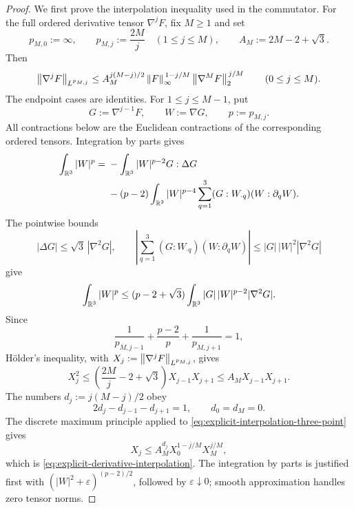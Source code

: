 \begin{proof}
We first prove the interpolation inequality used in the commutator.  For the
full ordered derivative tensor \(\nabla^jF\), fix \(M\ge1\) and set
\[
 p_{M,0}:=\infty,
 \qquad
 p_{M,j}:=\frac{2M}{j}\quad(1\le j\le M),
 \qquad
 A_M:=2M-2+\sqrt3.
\]
Then
\begin{equation}
 \left\lVert \nabla^jF\right\rVert_{L^{p_{M,j}}}
 \le A_M^{j(M-j)/2}
 \left\lVert F\right\rVert_\infty^{\,1-j/M}
 \left\lVert \nabla^MF\right\rVert_2^{\,j/M}
 \qquad(0\le j\le M).
 \label{eq:explicit-derivative-interpolation}
\end{equation}
The endpoint cases are identities.  For \(1\le j\le M-1\), put
\[
 G:=\nabla^{j-1}F,
 \qquad W:=\nabla G,
 \qquad p:=p_{M,j}.
\]
All contractions below are the Euclidean contractions of the corresponding
ordered tensors.  Integration by parts gives
\begin{align*}
 \int_{\mathbb R^3}|W|^p
 ={}&-\int_{\mathbb R^3}|W|^{p-2}G:\Delta G\\
 &-(p-2)\int_{\mathbb R^3}|W|^{p-4}
   \sum_{q=1}^3(G:W_{\cdot q})(W:\partial_qW).
\end{align*}
The pointwise bounds
\[
 |\Delta G|\le\sqrt3\,|\nabla^2G|,
 \qquad
 \left|\sum_{q=1}^3(G:W_{\cdot q})(W:\partial_qW)\right|
 \le |G|\,|W|^2|\nabla^2G|
\]
give
\[
 \int_{\mathbb R^3}|W|^p
 \le(p-2+\sqrt3)
 \int_{\mathbb R^3}|G|\,|W|^{p-2}|\nabla^2G|.
\]
Since
\[
 \frac1{p_{M,j-1}}+\frac{p-2}{p}
 +\frac1{p_{M,j+1}}=1,
\]
H\"older's inequality, with
\(
 X_j:=\left\lVert \nabla^jF\right\rVert_{L^{p_{M,j}}}
\), gives
\begin{equation}
 X_j^2
 \le\left(\frac{2M}{j}-2+\sqrt3\right)X_{j-1}X_{j+1}
 \le A_MX_{j-1}X_{j+1}.
 \label{eq:explicit-interpolation-three-point}
\end{equation}
The numbers \(d_j:=j(M-j)/2\) obey
\[
 2d_j-d_{j-1}-d_{j+1}=1,
 \qquad d_0=d_M=0.
\]
The discrete maximum principle applied to
\eqref{eq:explicit-interpolation-three-point} gives
\[
 X_j\le A_M^{d_j}X_0^{1-j/M}X_M^{j/M},
\]
which is \eqref{eq:explicit-derivative-interpolation}.  The integration by
parts is justified first with
\((|W|^2+\varepsilon)^{(p-2)/2}\), followed by
\(\varepsilon\downarrow0\); smooth approximation handles zero tensor norms.


\end{proof}
